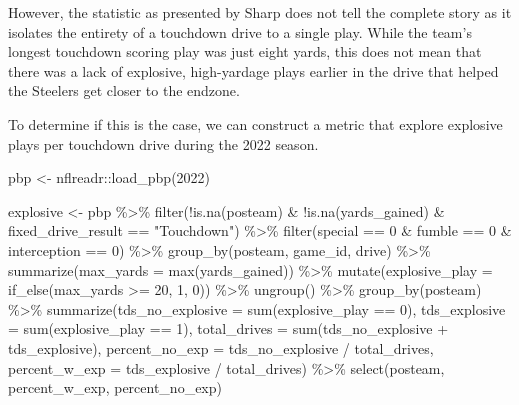 \documentclass[
  letterpaper,
]{krantz}
\newenvironment{Shaded}{\begin{snugshade}}{\end{snugshade}}
\newcommand{\AttributeTok}[1]{\textcolor[rgb]{0.40,0.45,0.13}{#1}}
\newcommand{\DecValTok}[1]{\textcolor[rgb]{0.68,0.00,0.00}{#1}}
\newcommand{\FunctionTok}[1]{\textcolor[rgb]{0.28,0.35,0.67}{#1}}
\newcommand{\NormalTok}[1]{\textcolor[rgb]{0.00,0.23,0.31}{#1}}
\newcommand{\OtherTok}[1]{\textcolor[rgb]{0.00,0.23,0.31}{#1}}
\newcommand{\SpecialCharTok}[1]{\textcolor[rgb]{0.37,0.37,0.37}{#1}}
\newcommand{\StringTok}[1]{\textcolor[rgb]{0.13,0.47,0.30}{#1}}
\begin{document}
However, the statistic as presented by Sharp does not tell the complete
story as it isolates the entirety of a touchdown drive to a single play.
While the team's longest touchdown scoring play was just eight yards,
this does not mean that there was a lack of explosive, high-yardage
plays earlier in the drive that helped the Steelers get closer to the
endzone.

To determine if this is the case, we can construct a metric that explore
explosive plays per touchdown drive during the 2022 season.

\begin{Shaded}
\begin{Highlighting}[]
\NormalTok{pbp }\OtherTok{\textless{}{-}}\NormalTok{ nflreadr}\SpecialCharTok{::}\FunctionTok{load\_pbp}\NormalTok{(}\DecValTok{2022}\NormalTok{)}

\NormalTok{explosive }\OtherTok{\textless{}{-}}\NormalTok{ pbp }\SpecialCharTok{\%\textgreater{}\%}
  \FunctionTok{filter}\NormalTok{(}\SpecialCharTok{!}\FunctionTok{is.na}\NormalTok{(posteam) }\SpecialCharTok{\&}
           \SpecialCharTok{!}\FunctionTok{is.na}\NormalTok{(yards\_gained)}
         \SpecialCharTok{\&}\NormalTok{ fixed\_drive\_result }\SpecialCharTok{==} \StringTok{"Touchdown"}\NormalTok{) }\SpecialCharTok{\%\textgreater{}\%}
  \FunctionTok{filter}\NormalTok{(special }\SpecialCharTok{==} \DecValTok{0} \SpecialCharTok{\&}\NormalTok{ fumble }\SpecialCharTok{==} \DecValTok{0} \SpecialCharTok{\&}\NormalTok{ interception }\SpecialCharTok{==} \DecValTok{0}\NormalTok{) }\SpecialCharTok{\%\textgreater{}\%}
  \FunctionTok{group\_by}\NormalTok{(posteam, game\_id, drive) }\SpecialCharTok{\%\textgreater{}\%}
  \FunctionTok{summarize}\NormalTok{(}\AttributeTok{max\_yards =} \FunctionTok{max}\NormalTok{(yards\_gained)) }\SpecialCharTok{\%\textgreater{}\%}
  \FunctionTok{mutate}\NormalTok{(}\AttributeTok{explosive\_play =} \FunctionTok{if\_else}\NormalTok{(max\_yards }\SpecialCharTok{\textgreater{}=} \DecValTok{20}\NormalTok{, }\DecValTok{1}\NormalTok{, }\DecValTok{0}\NormalTok{)) }\SpecialCharTok{\%\textgreater{}\%}
  \FunctionTok{ungroup}\NormalTok{() }\SpecialCharTok{\%\textgreater{}\%}
  \FunctionTok{group\_by}\NormalTok{(posteam) }\SpecialCharTok{\%\textgreater{}\%}
  \FunctionTok{summarize}\NormalTok{(}\AttributeTok{tds\_no\_explosive =} \FunctionTok{sum}\NormalTok{(explosive\_play }\SpecialCharTok{==} \DecValTok{0}\NormalTok{),}
            \AttributeTok{tds\_explosive =} \FunctionTok{sum}\NormalTok{(explosive\_play }\SpecialCharTok{==} \DecValTok{1}\NormalTok{),}
            \AttributeTok{total\_drives =} \FunctionTok{sum}\NormalTok{(tds\_no\_explosive }\SpecialCharTok{+}\NormalTok{ tds\_explosive),}
            \AttributeTok{percent\_no\_exp =}\NormalTok{ tds\_no\_explosive }\SpecialCharTok{/}\NormalTok{ total\_drives,}
            \AttributeTok{percent\_w\_exp =}\NormalTok{ tds\_explosive }\SpecialCharTok{/}\NormalTok{ total\_drives) }\SpecialCharTok{\%\textgreater{}\%}
  \FunctionTok{select}\NormalTok{(posteam, percent\_w\_exp, percent\_no\_exp)}
\end{Highlighting}
\end{Shaded}
\end{document}
